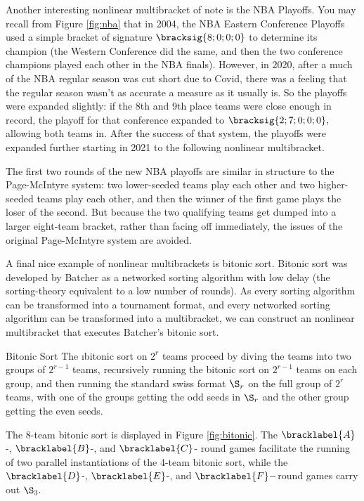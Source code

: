 {    Another interesting nonlinear multibracket of note is the NBA Playoffs. You may recall from Figure \ref{fig:nba} that in 2004, the NBA Eastern Conference Playoffs used a simple bracket of signature $\bracksig{8;0;0;0}$ to determine its champion (the Western Conference did the same, and then the two conference champions played each other in the NBA finals). However, in 2020, after a much of the NBA regular season was cut short due to Covid, there was a feeling that the regular season wasn't as accurate a measure as it usually is. So the playoffs were expanded slightly: if the 8th and 9th place teams were close enough in record, the playoff for that conference expanded to $\bracksig{2;7;0;0;0},$ allowing both teams in. After the success of that system, the playoffs were expanded further starting in 2021 to the following nonlinear multibracket.
    

    The first two rounds of the new NBA playoffs are similar in structure to the Page-McIntyre system: two lower-seeded teams play each other and two higher-seeded teams play each other, and then the winner of the first game plays the loser of the second. But because the two qualifying teams get dumped into a larger eight-team bracket, rather than facing off immediately, the issues of the original Page-McIntyre system are avoided.

    A final nice example of nonlinear multibrackets is bitonic sort. Bitonic sort was developed by Batcher \cite{batcher} as a networked sorting algorithm with low delay (the sorting-theory equivalent to a low number of rounds). As every sorting algorithm can be transformed into a tournament format, and every networked sorting algorithm can be transformed into a multibracket, we can construct an nonlinear multibracket that executes Batcher's bitonic sort.

    \begin{definition}{Bitonic Sort}{}
        The \i{bitonic sort} on $2^r$ teams proceed by diving the teams into two groups of $2^{r-1}$ teams, recursively running the bitonic sort on $2^{r-1}$ teams on each group, and then running the standard swiss format $\S_r$ on the full group of $2^r$ teams, with one of the groups getting the odd seeds in $\S_r$ and the other group getting the even seeds.
    \end{definition}

    The 8-team bitonic sort is displayed in Figure \ref{fig:bitonic}. The $\bracklabel{A}$-, $\bracklabel{B}$-, and $\bracklabel{C}$- round games facilitate the running of two parallel instantiations of the 4-team bitonic sort, while the $\bracklabel{D}$-, $\bracklabel{E}$-, and $\bracklabel{F}-$round games carry out $\S_3.$

}
